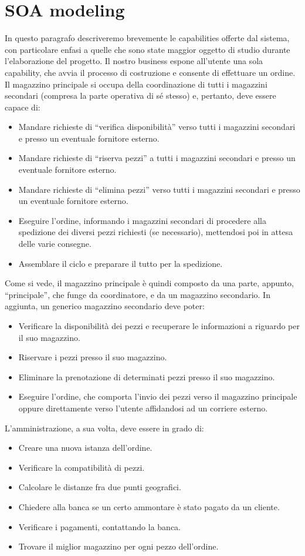 \documentclass[twoside]{article}
\begin{document}
\section{SOA modeling} \label{soa_modeling}
In questo paragrafo descriveremo brevemente le capabilities offerte dal sistema, con
particolare enfasi a quelle che sono state maggior oggetto di studio durante l'elaborazione
del progetto.
Il nostro business espone all'utente una sola capability, che avvia
il processo di costruzione e consente di effettuare un ordine.
Il magazzino principale si occupa della coordinazione di tutti i magazzini secondari (compresa la
parte operativa di sé stesso) e, pertanto, deve essere capace di:
\begin{itemize}
	\item Mandare richieste di
		  ``verifica disponibilità'' verso tutti i magazzini secondari e presso un eventuale
		  fornitore esterno.
	\item Mandare richieste di ``riserva pezzi''
		  a tutti i magazzini secondari e presso un eventuale fornitore esterno.
	\item Mandare richieste di
		  ``elimina pezzi'' verso tutti i magazzini secondari e presso un eventuale fornitore
		  esterno.
	\item Eseguire l'ordine, informando i magazzini secondari di procedere alla spedizione dei diversi pezzi
	   	  richiesti (se necessario), mettendosi poi in attesa delle varie consegne.
	\item Assemblare il ciclo e preparare il tutto per la spedizione.
\end{itemize}
Come si vede, il magazzino principale è quindi composto da una parte, appunto, ``principale'', che
funge da coordinatore, e da un magazzino secondario.
In aggiunta, un generico magazzino secondario deve poter:
\begin{itemize}
	\item Verificare la disponibilità dei pezzi e recuperare le informazioni a riguardo
		  per il suo magazzino.
	\item Riservare i pezzi presso il suo magazzino.
	\item Eliminare la prenotazione di determinati pezzi presso il suo magazzino.
	\item Eseguire l'ordine, che comporta l'invio dei pezzi verso il magazzino principale
		  oppure direttamente verso l'utente affidandosi ad un corriere esterno.
\end{itemize}
L'amministrazione, a sua volta, deve essere in grado di:
\begin{itemize}
	\item Creare una nuova istanza dell'ordine.
	\item Verificare la compatibilità di pezzi.
	\item Calcolare le distanze fra due punti geografici.
	\item Chiedere alla banca se un certo ammontare è stato pagato da un cliente.
	\item Verificare i pagamenti, contattando la banca.
	\item Trovare il miglior magazzino per ogni pezzo dell'ordine.
\end{itemize}
\end{document}
